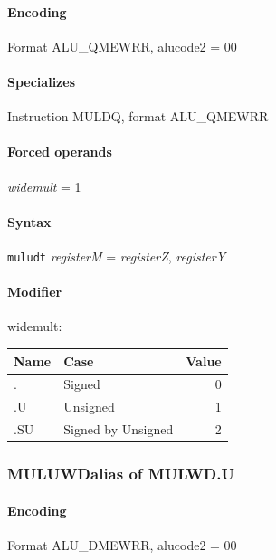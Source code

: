 {\paragraph{Encoding} Format \textsf{ALU\_QMEWRR, alucode2 = 00}\\



\paragraph{Specializes} Instruction MULDQ, format ALU\_QMEWRR

\paragraph{Forced operands} \emph{widemult} = 1

\paragraph{Syntax} \texttt{muludt} \emph{registerM} = \emph{registerZ}, \emph{registerY}

\paragraph{Modifier} \textsf{widemult}:\\

\noindent \begin{tabular}{|l|l|r|} \hline
\bf{Name} & \bf{Case} & \bf{Value} \\ \hline
. & Signed & 0 \\
.U & Unsigned & 1 \\
.SU & Signed by Unsigned & 2 \\
\hline \end{tabular}
\newpage
\subsubsection[{\small MULUWD: alias of MULWD.U}]{MULUWD\hfill alias of MULWD.U}
\label{instr:MULUWD}

\paragraph{Encoding} Format \textsf{ALU\_DMEWRR, alucode2 = 00}\\



}
